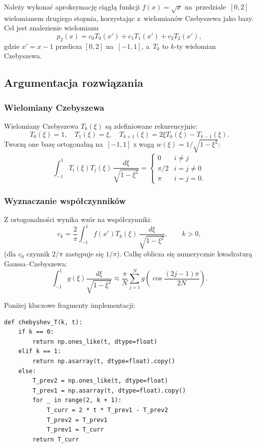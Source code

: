 \documentclass[12pt, a4paper]{article}
\begin{document}
Należy wykonać aproksymację ciągłą funkcji $f(x) = \sqrt{x}$
na~przedziale~$[0, 2]$ wielomianem drugiego stopnia, korzystając
z~wielomianów Czebyszewa jako bazy. Cel jest znalezienie wielomianu
\[
  p_2(x) = c_0 T_0(x') + c_1 T_1(x') + c_2 T_2(x'),
\]
gdzie $x' = x - 1$ przelicza $[0,2]$ na~$[-1,1]$,
a~$T_k$ to $k$-ty wielomian Czebyszewa.

\subsection{Argumentacja rozwiązania}

\subsubsection{Wielomiany Czebyszewa}

Wielomiany Czebyszewa $T_k(\xi)$ są zdefiniowane rekurencyjnie:
\[
  T_0(\xi) = 1,\quad T_1(\xi) = \xi,\quad
  T_{k+1}(\xi) = 2\xi T_k(\xi) - T_{k-1}(\xi).
\]
Tworzą one bazę ortogonalną na~$[-1,1]$ z wagą
$w(\xi) = 1/\sqrt{1 - \xi^2}$:
\[
  \int_{-1}^{1} T_i(\xi) T_j(\xi)\, \frac{d\xi}{\sqrt{1-\xi^2}}
  = \begin{cases} 0 & i \neq j \\ \pi/2 & i = j \neq 0 \\ \pi & i = j = 0. \end{cases}
\]

\subsubsection{Wyznaczanie współczynników}

Z ortogonalności wynika wzór na współczynniki:
\[
  c_k = \frac{2}{\pi} \int_{-1}^{1} f(x') T_k(\xi)\,
        \frac{d\xi}{\sqrt{1-\xi^2}}, \qquad k > 0,
\]
(dla $c_0$ czynnik $2/\pi$ zastępuje się $1/\pi$). Całkę oblicza
się numerycznie kwadraturą Gaussa--Czebyszewa:
\[
  \int_{-1}^{1} g(\xi) \frac{d\xi}{\sqrt{1-\xi^2}}
  \approx \frac{\pi}{N} \sum_{j=1}^{N} g\!\left(\cos\!\frac{(2j-1)\pi}{2N}\right).
\]

\noindent
Poniżej kluczowe fragmenty implementacji:

\begin{lstlisting}[caption={Rekurencyjne obliczanie wielomianów Czebyszewa}]
def chebyshev_T(k, t):
    if k == 0:
        return np.ones_like(t, dtype=float)
    elif k == 1:
        return np.asarray(t, dtype=float).copy()
    else:
        T_prev2 = np.ones_like(t, dtype=float)
        T_prev1 = np.asarray(t, dtype=float).copy()
        for _ in range(2, k + 1):
            T_curr = 2 * t * T_prev1 - T_prev2
            T_prev2 = T_prev1
            T_prev1 = T_curr
        return T_curr
\end{lstlisting}
\end{document}
